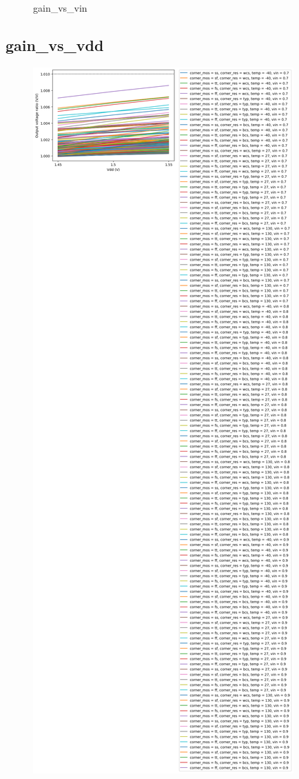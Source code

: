 \documentclass[
  a4paper,
  DIV=11,
  numbers=noendperiod]{scrartcl}
\begin{document}
\begin{tcolorbox}
\begin{figure}[H]
{}

\caption{gain\_vs\_vin}

\end{figure}%

\subsection*{gain\_vs\_vdd}\label{gain_vs_vdd-1}

\begin{figure}[H]

{\centering \includegraphics{./cace/_docs/ota-improved/schematic/gain_vs_vdd.png}

}
\end{figure}
\end{tcolorbox}
\end{document}
